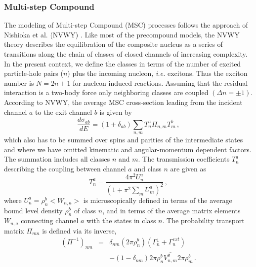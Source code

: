 \documentclass[twocolumn,amsmath,amssymb,10pt,groupedaddress,a4paper]{revtex4}
\begin{document}
\subsubsection{Multi-step Compound}

The modeling of Multi-step Compound (MSC)
processes follows the approach of Nishioka et al. (NVWY)
\cite{NVWY}. Like most of the precompound models, the NVWY theory
describes the equilibration of the composite nucleus as a series of
transitions along the chain of classes of closed channels of increasing
complexity. In the present context, we define the classes in terms
of the number of excited particle-hole pairs ($n$) plus the incoming
nucleon, {\it i.e.} excitons. Thus the exciton number is $N=2n+1$ for nucleon
induced reactions. Assuming that the residual interaction is a two-body
force only neighboring classes are coupled $(\Delta n=\pm1)$.
According to NVWY, the average MSC cross-section
leading from the incident channel $a$ to the exit channel $b$ is
given by
\begin{equation}
\frac{d\sigma_{ab}}{dE}=(1+\delta_{ab})\sum_{n,m}T_{n}^{a}\Pi_{n,m}T_{m}^{b}\,,
\label{msccs}
\end{equation}
which also has to be summed over spins and parities of the intermediate
states and where we have omitted kinematic and angular-momentum dependent
factors. The summation includes all classes $n$ and $m$. The transmission
coefficients $T_{n}^{a}$ describing the coupling between channel
$a$ and class $n$ are given as
\begin{equation}
T_{n}^{a}=\frac{4\pi^{2}U_{n}^{a}}{\left(1+\pi^{2}\sum_{m}U_{m}^{a}\right)^{2}}\,,
\label{TlMSC}
\end{equation}
\noindent where $U_{n}^{a}=\rho_{n}^{b}<W_{n,a}>$ is microscopically defined
in terms of the average bound level density
$\rho_{n}^{b}$ of class $n$, and in terms of the average matrix
elements $W_{n,a}$ connecting channel $a$ with the states in class
$n$. The probability transport matrix $\Pi_{mn}$ is defined via
its inverse,
\begin{eqnarray}
(\Pi^{-1})_{nm}&=&\delta_{nm}(2\pi\rho_{n}^{b})(\Gamma_{n}^{\downarrow}+\Gamma_{n}^{ext})\nonumber\\
&&-(1-\delta_{nm})2\pi\rho_{n}^{b}\overline{V_{n,m}^{2}}2\pi\rho_{m}^{b}\,.\label{Pi}
\end{eqnarray}
\end{document}
